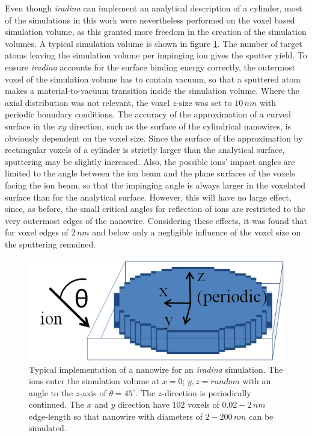 Even though \emph{iradina} can implement an analytical description of a cylinder, most of the simulations in this work were nevertheless performed on the voxel based simulation volume, as this granted more freedom in the creation of the simulation volumes. A typical simulation volume is shown in figure \ref{voxel}. The number of target atoms leaving the simulation volume per impinging ion gives the sputter yield. To ensure \emph{iradina} accounts for the surface binding energy correctly, the outermost voxel of the simulation volume has to contain vacuum, so that a sputtered atom makes a material-to-vacuum transition inside the simulation volume. Where the axial distribution was not relevant, the voxel $z$-size was set to $10\,nm$ with periodic boundary conditions. The accuracy of the approximation of a curved surface in the $xy$ direction, such as the surface of the cylindrical nanowires, is obviously dependent on the voxel size. Since the surface of the approximation by rectangular voxels of a cylinder is strictly larger than the analytical surface, sputtering may be slightly increased. Also, the possible ions' impact angles are limited to the angle between the ion beam and the plane surfaces of the voxels facing the ion beam, so that the impinging angle is always larger in the voxelated surface than for the analytical surface. However, this will have no large effect, since, as before, the small critical angles for reflection of ions are restricted to the very outermost edges of the nanowire. Considering these effects, it was found that for voxel edges of $2\,nm$ and below only a negligible influence of the voxel size on the sputtering remained. 

\begin{figure}
	\centering
		\includegraphics[width=.5\textwidth]{images/voxel.jpg}
	\caption{Typical implementation of a nanowire for an \emph{iradina} simulation. The ions enter the simulation volume at $x=0$; $y,z=random$ with an angle to the $z$-axis of $\theta = 45^\circ$. The $z$-direction is periodically continued. The $x$ and $y$ direction have $102$ voxels of $0.02-2\,nm$ edge-length so that nanowire with diameters of $2-200\,nm$ can be simulated.}
	\label{voxel}
\end{figure} 

